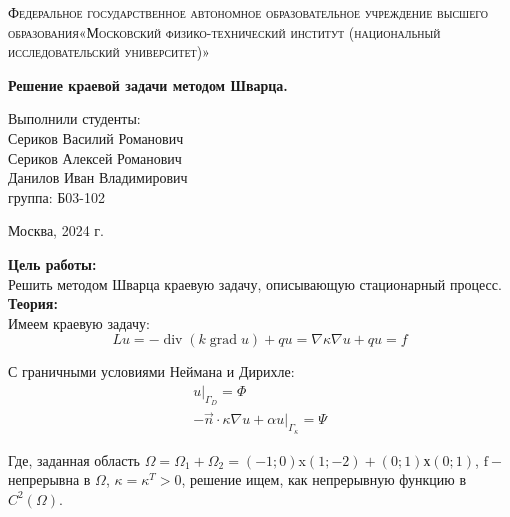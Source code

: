\documentclass[a4paper, 12pt]{article}%
\begin{document}
	\begin{titlepage}
		\begin{center}
			\textsc{Федеральное государственное автономное образовательное учреждение высшего образования«Московский физико-технический институт (национальный исследовательский университет)»\\[5mm]
			}
			
			\vfill
			
			\textbf{Решение краевой задачи методом Шварца.
				\\[50mm]
			}
			
		\end{center}
		
		\hfill
		\begin{minipage}{.5\textwidth}
			Выполнили студенты:\\[2mm]
			Сериков Василий Романович\\[2mm]
			Сериков Алексей Романович\\[2mm]
			Данилов Иван Владимирович\\[2mm]
			группа: Б03-102\\[5mm]
			
		\end{minipage}
		\vfill
		\begin{center}
			Москва, 2024 г.
		\end{center}
		
	\end{titlepage}
	
	\newpage
	\setcounter{page}{2}
	
	\textbf{Цель работы: }\\
	
	Решить методом Шварца краевую задачу, описывающую стационарный процесс.\\
	
	\textbf{Теория: }\\
	
		Имеем краевую задачу:
	$$
	L u=-\operatorname{div}(k \operatorname{grad} u)+ qu = \nabla \kappa \nabla u + qu=f
	$$
	
	С граничными условиями Неймана и Дирихле:
	$$
	\begin{gathered}
		\left.u\right|_{\Gamma_D}=\Phi \\
		-\vec{n} \cdot \kappa \nabla u+\left.\alpha u\right|_{\Gamma_\kappa}=\Psi
	\end{gathered}
	$$
	
	Где, заданная область $\Omega= \Omega_1 + \Omega_2 = (-1 ; 0)$x$(1 ; -2)+(0 ; 1)$х$(0 ; 1)$, $\mathrm{f}-$ непрерывна в $\Omega$, $\kappa=\kappa^T>0$, решение ищем, как непрерывную функцию в $C^2(\Omega)$.
	
\end{document}
